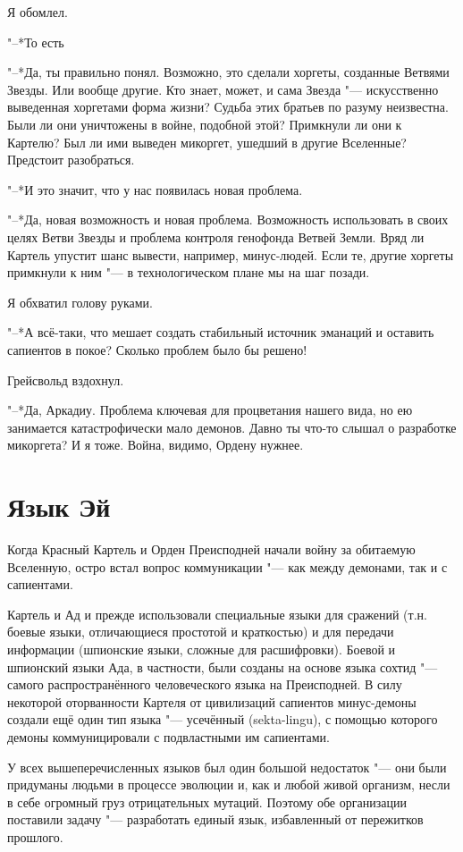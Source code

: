 \documentclass[a4paper,10pt,fleqn]{book}
\newcommand{\ldotsq}{\so{?\hbox{\hspace{-.212em}}..}\xspace}
\begin{document}
Я обомлел.

"--*То есть\ldotsq

"--*Да, ты правильно понял.
Возможно, это сделали хоргеты, созданные Ветвями Звезды.
Или вообще другие.
Кто знает, может, и сама Звезда "--- искусственно выведенная хоргетами форма жизни?
Судьба этих братьев по разуму неизвестна.
Были ли они уничтожены в войне, подобной этой?
Примкнули ли они к Картелю?
Был ли ими выведен микоргет, ушедший в другие Вселенные?
Предстоит разобраться.

"--*И это значит, что у нас появилась новая проблема.

"--*Да, новая возможность и новая проблема.
Возможность использовать в своих целях Ветви Звезды и проблема контроля генофонда Ветвей Земли.
Вряд ли Картель упустит шанс вывести, например, минус-людей.
Если те, другие хоргеты примкнули к ним "--- в технологическом плане мы на шаг позади.

Я обхватил голову руками.

"--*А всё-таки, что мешает создать стабильный источник эманаций и оставить сапиентов в покое?
Сколько проблем было бы решено!

Грейсвольд вздохнул.

"--*Да, Аркадиу.
Проблема ключевая для процветания нашего вида, но ею занимается катастрофически мало демонов.
Давно ты что-то слышал о разработке микоргета?
И я тоже.
Война, видимо, Ордену нужнее.

\section{Язык Эй}

Когда Красный Картель и Орден Преисподней начали войну за обитаемую Вселенную, остро встал вопрос коммуникации "--- как между демонами, так и с сапиентами.

Картель и Ад и прежде использовали специальные языки для сражений (т.н. боевые языки, отличающиеся простотой и краткостью) и для передачи информации (шпионские языки, сложные для расшифровки).
Боевой и шпионский языки Ада, в частности, были созданы на основе языка сохтид "--- самого распространённого человеческого языка на Преисподней.
В силу некоторой оторванности Картеля от цивилизаций сапиентов минус-демоны создали ещё один тип языка "--- усечённый (sekta-lingu), с помощью которого демоны коммуницировали с подвластными им сапиентами.

У всех вышеперечисленных языков был один большой недостаток "--- они были придуманы людьми в процессе эволюции и, как и любой живой организм, несли в себе огромный груз отрицательных мутаций.
Поэтому обе организации поставили задачу "--- разработать единый язык, избавленный от пережитков прошлого.
\end{document}

